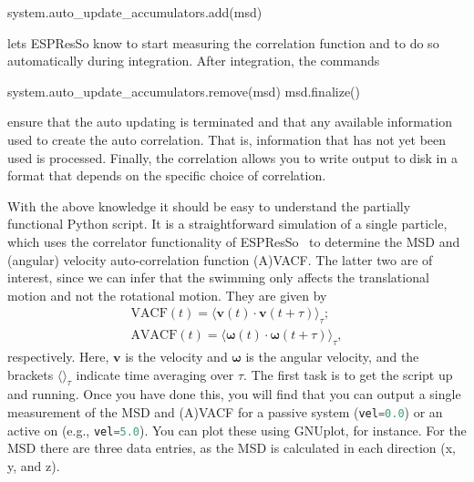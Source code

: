 \documentclass[aip,jcp,reprint,a4paper,onecolumn,amsmath]{revtex4-1}
\newcommand{\es}{\mbox{\textsf{ESPResSo}}\xspace}
\newcommand\codees{\lstinline[language=python]}
\begin{document}
\begin{espresso}
system.auto_update_accumulators.add(msd)
\end{espresso}
lets \es{} know to start measuring the correlation function and to do so automatically during integration. After integration, the commands
\begin{espresso}
system.auto_update_accumulators.remove(msd)
msd.finalize()
\end{espresso}
ensure that the auto updating is terminated and that any available information used to create the auto correlation. That is, information that has not yet been used is processed. Finally, the correlation allows you to write output to disk in a format that depends on the specific choice of correlation.

With the above knowledge it should be easy to understand the partially functional Python script. It is a straightforward simulation of a single particle, which uses the correlator functionality of \es{}~\cite{Arnold_13,UG} to determine the MSD and (angular) velocity auto-correlation function (A)VACF. The latter two are of interest, since we can infer that the swimming only affects the translational motion and not the rotational motion. They are given by
\begin{eqnarray}
\label{eq:vacf} \mathrm{VACF}(t) = \langle \mathbf{v}(t) \cdot \mathbf{v}(t + \tau) \rangle_{\tau}; \\
\label{eq:avacf} \mathrm{AVACF}(t) = \langle \boldsymbol{\omega}(t) \cdot \boldsymbol{\omega}(t + \tau) \rangle_{\tau} ,
\end{eqnarray}
respectively. Here, $\mathbf{v}$ is the velocity and $\boldsymbol{\omega}$ is the angular velocity, and the brackets $\langle \rangle_{\tau}$ indicate time averaging over $\tau$. The first task is to get the script up and running. Once you have done this, you will find that you can output a single measurement of the MSD and (A)VACF for a passive system (\codees{vel=0.0}) or an active on (e.g., \codees{vel=5.0}). You can plot these using GNUplot, for instance. For the MSD there are three data entries, as the MSD is calculated in each direction (x, y, and z).
\end{document}
